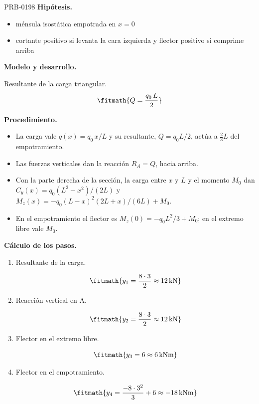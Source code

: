 \begin{studiumworked}{PRB-0198}
\textbf{Hipótesis.}\begin{itemize}\item ménsula isostática empotrada en $x = 0$
\item cortante positivo si levanta la cara izquierda y flector positivo si comprime arriba\end{itemize}

\textbf{Modelo y desarrollo.}

Resultante de la carga triangular.\[\fitmath{Q = \frac{q_0\,L}{2}}\]

\textbf{Procedimiento.}\begin{itemize}\item La carga vale $q(x) = q_0\,x/L$ y su resultante, $Q = q_0 L/2$, actúa a $\tfrac{2}{3}L$ del empotramiento.
\item Las fuerzas verticales dan la reacción $R_A = Q$, hacia arriba.
\item Con la parte derecha de la sección, la carga entre $x$ y $L$ y el momento $M_0$ dan $C_y(x) = q_0 (L^2 - x^2)/(2L)$ y $M_z(x) = -q_0 (L - x)^2 (2L + x)/(6L) + M_0$.
\item En el empotramiento el flector es $M_z(0) = -q_0 L^2/3 + M_0$; en el extremo libre vale $M_0$.\end{itemize}

\textbf{Cálculo de los pasos.}

\begin{enumerate}

\item Resultante de la carga.

\[\fitmath{y_{1}=\frac{8\cdot 3}{2}\approx 12\,\mathrm{kN}}\]

\item Reacción vertical en A.

\[\fitmath{y_{2}=\frac{8\cdot 3}{2}\approx 12\,\mathrm{kN}}\]

\item Flector en el extremo libre.

\[\fitmath{y_{3}=6\approx 6\,\mathrm{kN m}}\]

\item Flector en el empotramiento.

\[\fitmath{y_{4}=\frac{-8\cdot {3}^{2}}{3}+6\approx -18\,\mathrm{kN m}}\]

\end{enumerate}


\end{studiumworked}
